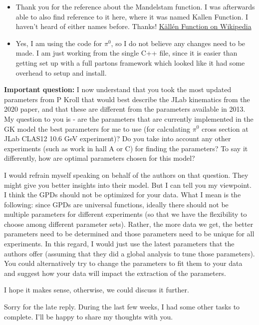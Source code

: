     \begin{itemize}
        \item Thank you for the reference about the Mandelstam function. I was afterwards able to also find reference to it here, where it was named Kallen Function. I haven't heard of either names before. Thanks! \href{https://en.wikipedia.org/wiki/K%C3%A4ll%C3%A9n_function}{Källén Function on Wikipedia}
    
        \item Yes, I am using the code for $\pi^0$, so I do not believe any changes need to be made. I am just working from the single C++ file, since it is easier than getting set up with a full partons framework which looked like it had some overhead to setup and install.
    \end{itemize}
    
    \textbf{Important question:} I now understand that you took the most updated parameters from P Kroll that would best describe the JLab kinematics from the 2020 paper, and that these are different from the parameters available in 2013. My question to you is - are the parameters that are currently implemented in the GK model the best parameters for me to use (for calculating $\pi^0$ cross section at JLab CLAS12 10.6 GeV experiment)? Do you take into account any other experiments (such as work in hall A or C) for finding the parameters? To say it differently, how are optimal parameters chosen for this model?
    
    I would refrain myself speaking on behalf of the authors on that question. They might give you better insights into their model. But I can tell you my viewpoint. I think the GPDs should not be optimized for your data. What I mean is the following: since GPDs are universal functions, ideally there should not be multiple parameters for different experiments (so that we have the flexibility to choose among different parameter sets). Rather, the more data we get, the better parameters need to be determined and those parameters need to be unique for all experiments. In this regard, I would just use the latest parameters that the authors offer (assuming that they did a global analysis to tune those parameters). You could alternatively try to change the parameters to fit them to your data and suggest how your data will impact the extraction of the parameters.
    
    I hope it makes sense, otherwise, we could discuss it further.
    
    Sorry for the late reply. During the last few weeks, I had some other tasks to complete. I'll be happy to share my thoughts with you.
    
